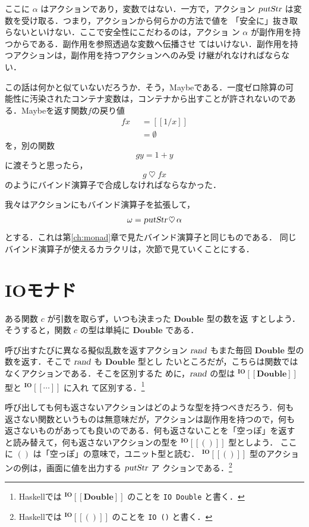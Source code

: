 \documentclass[a5paper,twoside,fleqn,draft]{jsbook}
\def\[{[\![}
\def\]{]\!]}
\newcommand{\programminglanguage}[1]{\textsf{#1}}
\newcommand{\haskell}{\programminglanguage{Haskell}}
\newcommand{\code}[1]{\texttt{#1}}
\newcommand{\mKeyword}[1]{\mathsf{#1}}
\newcommand{\mOtherwiseKeyword}{\mKeyword{otherwise}}
\DeclareMathOperator{\mOtherwise}{\mOtherwiseKeyword}
\newcommand{\mNothing}{\emptyset}
\newcommand{\mAction}[1]{\textsl{#1}}
\DeclareMathOperator{\mPutStr}{\mAction{putStr}}
\DeclareMathOperator{\mRand}{\mAction{rand}}
\DeclareMathOperator{\mBind}{\heartsuit}
\newcommand{\mType}[1]{\mathbf{#1}} %
\newcommand{\mDoubleType}{\mType{Double}}
\newcommand{\mUnitType}{\mType{()}}
\newcommand{\mTypeAssemble}[2]{{}^{\mType{#1}}\[\mType{#2}\]}
\newcommand{\mIOType}[1]{\mTypeAssemble{IO}{#1}}
\newcommand{\mIODoubleType}{\mIOType{\mDoubleType}}
\newcommand{\mIOUnitType}{\mIOType{\mUnitType}}
\newcommand{\mValueConstructor}[1]{\mathrm{#1}}
\newcommand{\mValueWith}[2]{{}^\mValueConstructor{#1}\[#2\]}
\newcommand{\mJustWith}[1]{\[#1\]}%
\newcommand{\mGuard}[1]{\mathop{\mid_{#1}}}
\begin{document}
ここに $\alpha$ はアクションであり，変数ではない．一方で，アクション
$\mPutStr$ は変数を受け取る．つまり，アクションから何らかの方法で値を
「安全に」抜き取らないといけない．ここで安全性にこだわるのは，アクショ
ン $\alpha$ が副作用を持つからである．副作用を参照透過な変数へ伝播させ
てはいけない．副作用を持つアクションは，副作用を持つアクションへのみ受
け継がれなければならない．

この話は何かと似ていないだろうか．そう，Maybeである．一度ゼロ除算の可
能性に汚染されたコンテナ変数は，コンテナから出すことが許されないのであ
る．Maybeを返す関数$f$の戻り値
\begin{equation}
  \begin{aligned}
    fx&\mGuard{x\neq0}=\mJustWith{1/x}\\
    &\mGuard{\mOtherwise}=\mNothing
  \end{aligned}
\end{equation}
を，別の関数
\begin{equation}
  gy=1+y
\end{equation}
に渡そうと思ったら，
\begin{equation}
  g\mBind fx
\end{equation}
のようにバインド演算子で合成しなければならなかった．

我々はアクションにもバインド演算子を拡張して，
\begin{equation}
  \omega=\mPutStr\mBind\alpha
\end{equation}
とする．これは第\ref{ch:monad}章で見たバインド演算子と同じものである．
同じバインド演算子が使えるカラクリは，次節で見ていくことにする．

\section{IOモナド}

ある関数 $c$ が引数を取らず，いつも決まった $\mDoubleType$ 型の数を返
すとしよう．そうすると，関数 $c$ の型は単純に $\mDoubleType$ である．

呼び出すたびに異なる擬似乱数を返すアクション $\mRand$ もまた毎回
$\mDoubleType$ 型の数を返す．そこで $\mRand$ も $\mDoubleType$ 型とし
たいところだが，こちらは関数ではなくアクションである．そこを区別するた
めに，$\mRand$ の型は $\mIODoubleType$ 型と $\mIOType{\dotsb}$ に入れ
て区別する．\footnote{\haskell では $\mIODoubleType$ のことを \code{IO
Double} と書く．}

呼び出しても何も返さないアクションはどのような型を持つべきだろう．何も
返さない関数というものは無意味だが，アクションは副作用を持つので，何も
返さないものがあっても良いのである．何も返さないことを「空っぽ」を返す
と読み替えて，何も返さないアクションの型を $\mIOUnitType$ 型としよう．
ここに $\mUnitType$ は「空っぽ」の意味で，ユニット型と読む．
$\mIOUnitType$ 型のアクションの例は，画面に値を出力する $\mPutStr$ ア
クションである．\footnote{\haskell では $\mIOUnitType$ のことを
  \code{IO ()} と書く．}
\end{document}
